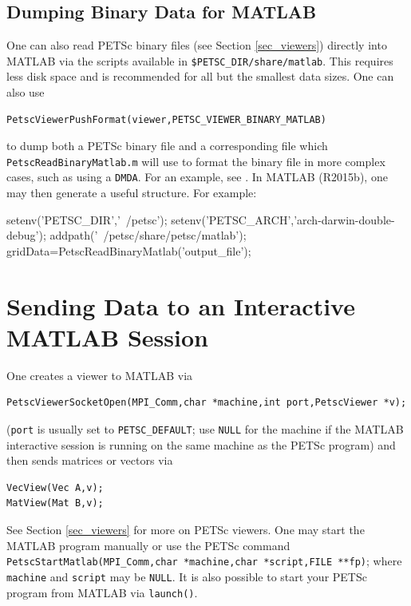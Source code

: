 \subsection{Dumping Binary Data for MATLAB}
One can also read PETSc binary files (see Section \ref{sec_viewers}) directly into MATLAB via the scripts available in \lstinline{$PETSC_DIR/share/matlab}.
This requires less disk space and is recommended for all but the smallest data sizes.
One can also use
\begin{lstlisting}
PetscViewerPushFormat(viewer,PETSC_VIEWER_BINARY_MATLAB)
\end{lstlisting}
to dump both a PETSc binary file and a corresponding  file which
\lstinline{PetscReadBinaryMatlab.m} will use to format the binary file in more complex cases, such as using a \lstinline{DMDA}.
For an example, see \href{https://www.mcs.anl.gov/petsc/petsc-current/src/dm/tutorials/ex7.c.html}{}.
In MATLAB (R2015b), one may then generate a useful structure. For example:
\begin{outputlisting}[\normalsize\ttfamily]
setenv('PETSC_DIR','~/petsc');
setenv('PETSC_ARCH','arch-darwin-double-debug');
addpath('~/petsc/share/petsc/matlab');
gridData=PetscReadBinaryMatlab('output_file');
\end{outputlisting}

\section{Sending Data to an Interactive MATLAB Session}
\label{sec_matlabsocket}

One creates a viewer to MATLAB via
\begin{lstlisting}
PetscViewerSocketOpen(MPI_Comm,char *machine,int port,PetscViewer *v);
\end{lstlisting}
(\lstinline{port} is usually set to \lstinline{PETSC_DEFAULT}; use \lstinline{NULL} for the machine if the
MATLAB interactive session is running on the same machine as the PETSc program)
and then sends matrices or vectors via
\begin{lstlisting}
VecView(Vec A,v);
MatView(Mat B,v);
\end{lstlisting}
See Section \ref{sec_viewers} for more on PETSc viewers.
One may start the MATLAB program manually or use the PETSc command
\lstinline{PetscStartMatlab(MPI_Comm,char *machine,char *script,FILE **fp)}; where \lstinline{machine} and \lstinline{script} may be \lstinline{NULL}.
It is also possible to start your PETSc program from MATLAB via \lstinline{launch()}.

